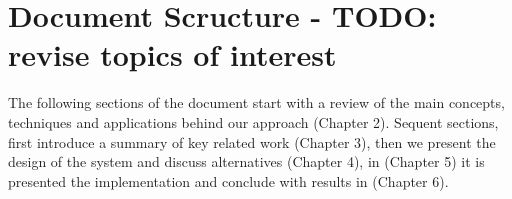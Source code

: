 \section{Document Scructure - TODO: revise topics of interest} %
\label{sec:document_structure}

The following sections of the document start with a review of the main concepts,
techniques and applications behind our approach (Chapter 2).
Sequent sections, first introduce a summary of key related work (Chapter 3), then we present the design of the system and discuss alternatives (Chapter 4),
in (Chapter 5) it is presented the implementation and conclude with results in (Chapter 6).